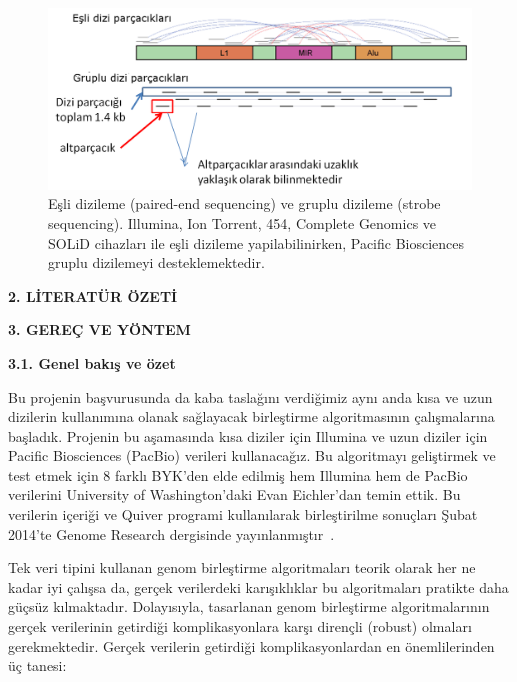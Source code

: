 \documentclass[11pt]{article}
\begin{document}
\begin{figure}[htb]
\begin{center}
  \includegraphics[scale=0.75]{strobe.png}
\end{center}
\caption{Eşli dizileme (paired-end sequencing) ve gruplu dizileme (strobe sequencing). Illumina, Ion Torrent, 454, Complete Genomics ve SOLiD cihazları ile eşli dizileme yapilabilinirken, Pacific Biosciences gruplu dizilemeyi desteklemektedir.}
\label{fig:strobe}
\end{figure}


\noindent

\clearpage
\begin{center}
{\bf \Large 2. LİTERATÜR ÖZETİ}
\end{center}




\begin{center}
{\bf \Large 3. GEREÇ VE YÖNTEM} 
\end{center}
\noindent

{\bf \large 3.1. Genel bakış ve özet}

Bu projenin başvurusunda da kaba taslağını verdiğimiz aynı anda kısa ve uzun dizilerin kullanımına olanak sağlayacak birleştirme algoritmasının çalışmalarına başladık. Projenin bu aşamasında
 kısa diziler için Illumina ve uzun diziler için Pacific Biosciences (PacBio) verileri kullanacağız. Bu algoritmayı geliştirmek ve test etmek için 8 farklı BYK'den elde edilmiş 
hem Illumina hem de PacBio verilerini University of Washington'daki Evan Eichler'dan temin ettik. Bu verilerin içeriği ve Quiver 
programi kullanılarak birleştirilme sonuçları Şubat 2014’te Genome Research dergisinde yayınlanmıştır~\cite{Huddleston2014}. 

Tek veri tipini kullanan genom birleştirme algoritmaları teorik olarak her ne kadar iyi çalışsa da, gerçek verilerdeki karışıklıklar bu algoritmaları pratikte daha güçsüz kılmaktadır. Dolayısıyla, tasarlanan genom birleştirme algoritmalarının gerçek verilerinin getirdiği komplikasyonlara karşı dirençli (robust) olmaları gerekmektedir. Gerçek verilerin getirdiği komplikasyonlardan en önemlilerinden üç tanesi:
\end{document}
